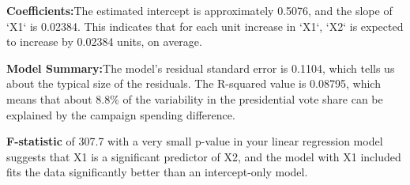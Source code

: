 \documentclass[12pt]{article}
\begin{document}
\textbf{Coefficients:}The estimated intercept is approximately 0.5076, and the slope of `X1` is 0.02384. This indicates that for each unit increase in `X1`, `X2` is expected to increase by 0.02384 units, on average.

\textbf{Model Summary:}The model's residual standard error is 0.1104, which tells us about the typical size of the residuals. The R-squared value is 0.08795, which means that about 8.8\% of the variability in the presidential vote share can be explained by the campaign spending difference.

 \textbf{F-statistic }of 307.7 with a very small p-value in your linear regression model suggests that X1 is a significant predictor of X2, and the model with X1 included fits the data significantly better than an intercept-only model.
\end{document}
